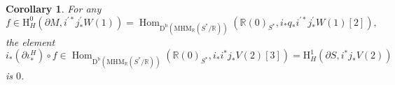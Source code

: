 \documentclass[11pt, a4paper]{amsart}
\theoremstyle{plain}
\newtheorem{corollary}[theorem]{Corollary}
\theoremstyle{definition}
\numberwithin{equation}{section}
\def\RR{\mathbb{R}}
\DeclareMathOperator{\Hom}{Hom}
\begin{document}
\begin{corollary}
\label{Corollary: Hodge theta is zero}
    For any 
    \begin{equation*}
        f \in \mathrm{H}^{0}_{H}(\partial M, i^{\prime*}j^{\prime }_{*}W(1)) = \Hom_{\mathrm{D}^{\mathrm{b}}(\mathrm{MHM}_{\RR}(S^{*}/\RR))}(\RR(0)_{S^{*}}, i_{*}q_{*}i^{\prime*}j^{\prime}_{*}W(1)[2]), 
    \end{equation*}
    the element 
    \begin{equation*}
        i_{*} (\partial \iota_{*}^{H}) \circ f \in \Hom_{\mathrm{D}^{\mathrm{b}}(\mathrm{MHM}_{\RR}(S^{*}/\RR))}(\RR(0)_{S^{*}}, i_{*}i^{*}j_{*}V(2)[3]) = \mathrm{H}^{1}_{H}(\partial S, i^{*}j_{*}V(2))
    \end{equation*}
    is $0$. 
\end{corollary}
\end{document}
